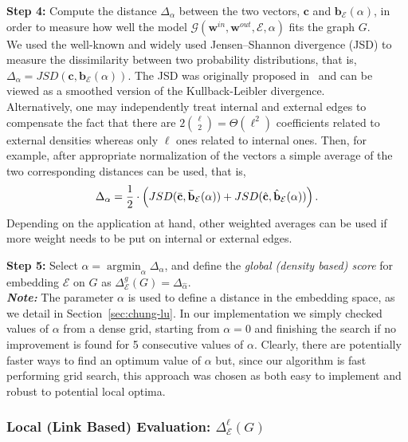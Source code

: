 \documentclass[11pt]{article}
\newcommand{\emb}{\mathcal E}
\DeclareMathOperator*{\argmin}{argmin}
\begin{document}
\medskip \noindent \textbf{Step 4:} Compute the distance $\Delta_\alpha$ between the two vectors, $\textbf{c}$ and $\textbf{b}_\emb(\alpha)$, in order to measure how well the model $\mathcal{G}(\textbf{w}^{in}, \textbf{w}^{out}, \emb, \alpha)$ fits the graph $G$. \\
We used the well-known and widely used Jensen–Shannon divergence (JSD) to measure the dissimilarity between two probability distributions, that is, $\Delta_\alpha = JSD(\textbf{c},\textbf{b}_\emb(\alpha))$. The JSD was originally proposed in~\cite{Lin1991} and can be viewed as a smoothed version of the Kullback-Leibler divergence. \\
Alternatively, one may independently treat internal and external edges to compensate the fact that there are $2 \binom{\ell}{2} = \Theta(\ell^2)$ coefficients related to external densities whereas only $\ell$ ones related to internal ones. Then, for example, after appropriate normalization of the vectors a simple average of the two corresponding distances can be used, that is,
\begin{equation*}
\Delta_\alpha = \frac 12 \cdot \left(
JSD(\bar{\bf c},\bar{\bf b}_\emb(\alpha)) +  JSD(\hat{\bf c},\hat{\bf b}_\emb(\alpha))
\right).
\end{equation*}
Depending on the application at hand, other weighted averages can be used if more weight needs to be put on internal or external edges.

\medskip \noindent \textbf{Step 5:} Select $\hat{\alpha} = \argmin_{\alpha} \Delta_\alpha$, and define the \emph{global (density based) score} for embedding $\emb$ on $G$ as $\Delta_\emb^g(G) = \Delta_{\hat{\alpha}}$. \\
\noindent \textbf{\it Note:}
The parameter $\alpha$ is used to define a distance in the embedding space, as we detail in Section~\ref{sec:chung-lu}.
In our implementation we simply checked values of $\alpha$ from a dense grid, starting from $\alpha=0$ and finishing the search if no improvement is found for 5 consecutive values of $\alpha$. Clearly, there are potentially faster ways to find an optimum value of $\alpha$ but, since our algorithm is fast performing grid search, this approach was chosen as both easy to implement and robust to potential local optima.

\subsubsection{Local (Link Based) Evaluation: $\Delta_\emb^{\ell}(G)$}
\end{document}
